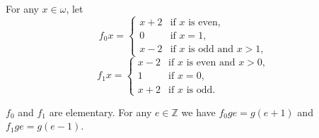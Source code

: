 For any $x \in \omega$, let
$$f_0 x = \begin{cases} x + 2 & \text{if } x \text{ is even}, \\ 0 & \text{if } x = 1, \\ x - 2 & \text{if } x \text{ is odd and } x > 1, \end{cases}$$
$$f_1 x = \begin{cases} x - 2 & \text{if } x \text{ is even and } x > 0, \\ 1 & \text{if } x = 0, \\ x + 2 & \text{if } x \text{ is odd}. \end{cases}$$

$f_0$ and $f_1$ are elementary. For any $e \in \mathbb{Z}$ we have $f_0 g e = g(e + 1)$ and $f_1 g e = g(e - 1)$.
